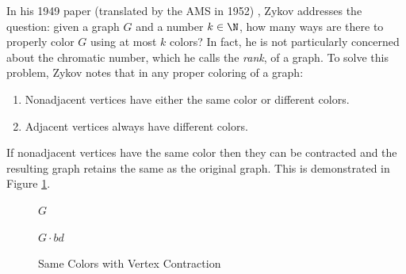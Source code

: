 In his 1949 paper (translated by the AMS in 1952) \cite{zykov}, Zykov addresses the question: given a graph \(G\) and
a number \(k\in\N\), how many ways are there to properly color \(G\) using at most \(k\) colors?  In fact, he is not
particularly concerned about the chromatic number, which he calls the \emph{rank}, of a graph.  To solve this problem,
Zykov notes that in any proper coloring of a graph:
\begin{enumerate}
\item Nonadjacent vertices have either the same color or different colors.
\item Adjacent vertices always have different colors.
\end{enumerate}
If nonadjacent vertices have the same color then they can be contracted and the resulting graph retains the same
 as the original graph.  This is demonstrated in Figure \ref{fig:zvcon}.

\begin{figure}[h]
  \label{fig:zvcon}
  \begin{center}
    \begin{minipage}{2in}
      \begin{center}

        \bigskip

        \(G\)
      \end{center}
    \end{minipage}
    \begin{minipage}{2in}
      \begin{center}

        \bigskip

        \(G\cdot bd\)
      \end{center}
    \end{minipage}
  \end{center}
  \caption{Same Colors with Vertex Contraction}
\end{figure}

